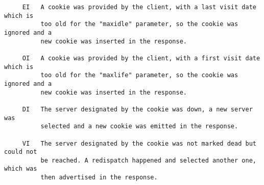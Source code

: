 \begin{verbatim}
     EI   A cookie was provided by the client, with a last visit date which is
          too old for the "maxidle" parameter, so the cookie was ignored and a
          new cookie was inserted in the response.

     OI   A cookie was provided by the client, with a first visit date which is
          too old for the "maxlife" parameter, so the cookie was ignored and a
          new cookie was inserted in the response.

     DI   The server designated by the cookie was down, a new server was
          selected and a new cookie was emitted in the response.

     VI   The server designated by the cookie was not marked dead but could not
          be reached. A redispatch happened and selected another one, which was
          then advertised in the response.


\end{verbatim}
